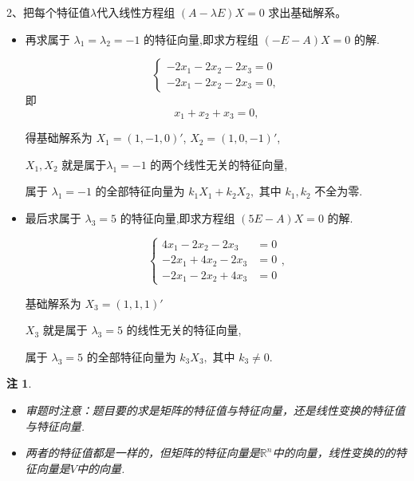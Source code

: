 \documentclass[13pt]{beamer}
\newtheorem*{rem}{注}
\begin{document}
\begin{frame}
2、把每个特征值$\lambda$代入线性方程组 $(A-\lambda E) X=0$
求出基础解系。
\begin{itemize}
\item 再求属于 $\lambda_{1}=\lambda_{2}=-1$ 的特征向量,即求方程组 $(-E-A) X=0$ 的解.

$$\left\{\begin{array}{l}-2 x_{1}-2 x_{2}-2 x_{3}=0 \\ -2 x_{1}-2 x_{2}-2 x_{3}=0,\end{array}\right.$$
即 $$x_{1}+x_{2}+x_{3}=0,$$

得基础解系为 
$X_{1}=(1,-1,0)'$,
$X_{2}=(1,0,-1)'$,

$X_{1}, X_{2}$ 就是属于$\lambda_{1}=-1$ 的两个线性无关的特征向量,

属于 $\lambda_{1}=-1$ 的全部特征向量为 $k_{1} X_{1}+k_{2} X_{2},$ 其中 $k_{1}, k_{2}$ 不全为零. 
\end{itemize}
\end{frame}
\begin{frame}

\begin{itemize}
\item 最后求属于 $\lambda_{3}=5$ 的特征向量,即求方程组 $(5 E-A) X=0$ 的解.

$$\left\{\begin{aligned} 4 x_{1}-2 x_{2}-2 x_{3} &=0 \\-2 x_{1}+4 x_{2}-2 x_{3} &=0
\\-2 x_{1}-2 x_{2}+4 x_{3} &=0 \end{aligned}\right.,$$

基础解系为  $X_{3}=(1,1,1)'$

 $X_{3}$ 就是属于 $\lambda_{3}=5$ 的线性无关的特征向量,

属于 $\lambda_{3}=5$ 的全部特征向量为 $k_{3} X_{3},$ 其中 $k_{3} \neq 0$.
\end{itemize}

\begin{rem}
\begin{itemize}
\item 审题时注意：题目要的求是矩阵的特征值与特征向量，还是线性变换的特征值与特征向量.

\item 两者的特征值都是一样的，但矩阵的特征向量是$\mathbb{R}^n$中的向量，线性变换的的特征向量是$V$中的向量.
\end{itemize}
\end{rem}
\end{frame}
\end{document}

